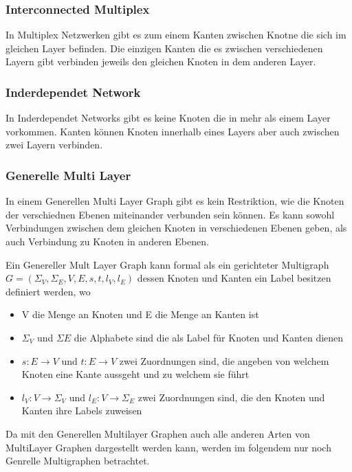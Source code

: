 \subsubsection{Interconnected Multiplex}

In Multiplex Netzwerken gibt es zum einem Kanten zwischen Knotne die sich im gleichen Layer befinden. Die einzigen Kanten die es zwischen verschiedenen Layern gibt verbinden jeweils den gleichen Knoten in dem anderen Layer. 

\subsubsection{Inderdependet Network}

In Inderdependet Networks gibt es keine Knoten die in mehr als einem Layer vorkommen. Kanten können Knoten innerhalb eines Layers aber auch zwischen zwei Layern verbinden.

\subsubsection{Generelle Multi Layer}
In einem Generellen Multi Layer Graph gibt es kein Restriktion, wie die Knoten der verschiednen Ebenen miteinander verbunden sein können. Es kann sowohl Verbindungen zwischen dem gleichen Knoten in verschiedenen Ebenen geben, als auch Verbindung zu Knoten in anderen Ebenen.


Ein Genereller Mult Layer Graph kann formal als ein gerichteter Multigraph\cite{article} $G = (\Sigma_{V}, \Sigma_{E}, V, E, s, t, l_{V}, l_{E})$ dessen Knoten und Kanten ein Label besitzen  definiert werden, wo

\begin{itemize}
  \item V die Menge an Knoten und E die Menge an Kanten ist
  \item $\Sigma_{V}$ und $\Sigma{E}$ die Alphabete sind die als Label für Knoten und Kanten dienen
  \item $s: E \rightarrow V$ und $t: E \rightarrow V$ zwei Zuordnungen sind, die angeben von welchem Knoten eine Kante aussgeht und zu welchem sie führt
  \item $l_{V}: V \rightarrow \Sigma_{V}$ und $l_{E}: V \rightarrow \Sigma_{E}$ zwei Zuordnungen sind, die den Knoten und Kanten ihre Labels zuweisen
\end{itemize}

Da mit den Generellen Multilayer Graphen auch alle anderen Arten von MultiLayer Graphen dargestellt werden kann, werden im folgendem nur noch Genrelle Multigraphen betrachtet.
